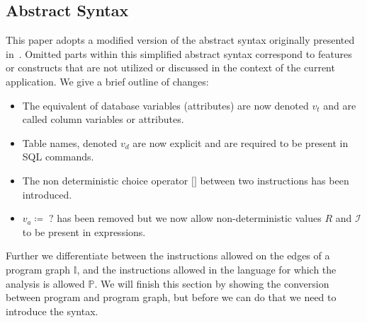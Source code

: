\subsection{Abstract Syntax} \label{subsec:abstract-syntax}

This paper adopts a modified version of the abstract syntax originally presented in~\cite{cortesi_abstract_2013}.
Omitted parts within this simplified abstract syntax correspond to features or constructs that are not utilized or discussed in the context of the current application.
We give a brief outline of changes:
\begin{itemize}
    \item The equivalent of database variables (attributes) are now denoted $v_t$ and are called column variables or attributes.
    \item Table names, denoted $v_d$ are now explicit and are required to be present in SQL commands.
    \item The non deterministic choice operator $\texttt{[]}$ between two instructions has been introduced.
    \item $v_a \coloneq \; ?$ has been removed but we now allow non-deterministic values $R$ and $\mathscr{I}$ to be present in expressions.
\end{itemize}

Further we differentiate between the instructions allowed on the edges of a program graph $\mathbb{I}$, and the instructions allowed in the language for which the analysis is allowed $\mathbb{P}$.
We will finish this section by showing the conversion between program and program graph, but before we can do that we need to introduce the syntax.

